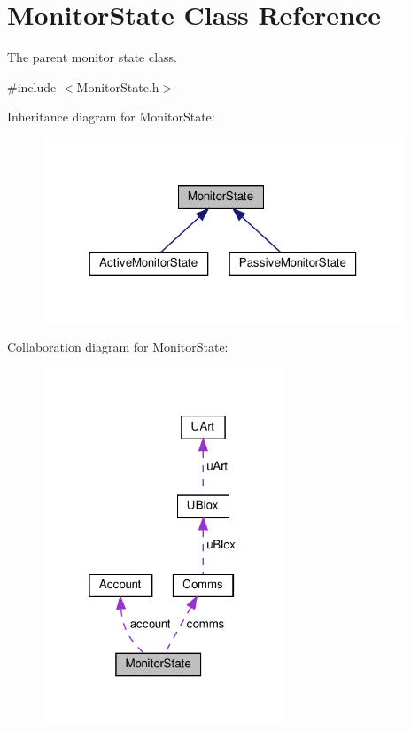 \hypertarget{class_monitor_state}{}\section{Monitor\+State Class Reference}
\label{class_monitor_state}


The parent monitor state class.  




{\ttfamily \#include $<$Monitor\+State.\+h$>$}



Inheritance diagram for Monitor\+State\+:\nopagebreak
\begin{figure}[H]
\begin{center}
\leavevmode
\includegraphics[width=306pt]{d2/de4/class_monitor_state__inherit__graph}
\end{center}
\end{figure}


Collaboration diagram for Monitor\+State\+:\nopagebreak
\begin{figure}[H]
\begin{center}
\leavevmode
\includegraphics[width=205pt]{da/dc4/class_monitor_state__coll__graph}
\end{center}
\end{figure}
